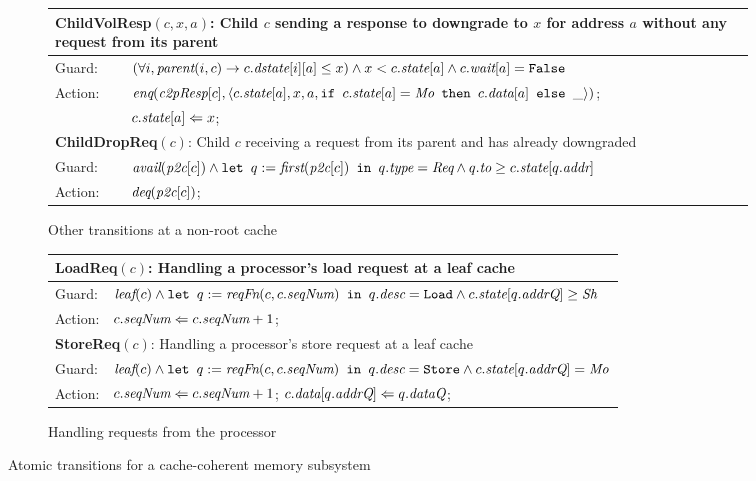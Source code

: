 \begin{figure}
\begin{subfigure}{\textwidth}
\centering
\begin{tabular}{|ll|}
\hline
\multicolumn{2}{|p{\textwidth}|}{\textbf{ChildVolResp}$(c, x, a)$: Child $c$
sending a response to downgrade to $x$ for address $a$ without any request from
its parent}\\
\hline
Guard: & $(\forall i, \textit{parent}(i, c) \rightarrow c.\textit{dstate}[i][a] \le x) \wedge x < c.\textit{state}[a] \wedge c.\textit{wait}[a] = \texttt{False}$\\
\hline
Action: & $\enq(\cpResp[c], \langle c.\state[a], x, a,%
\myif c.\state[a] = \Mo \mythen c.\data[a] \myelse \_\rangle)$;\\
& $c.\textit{state}[a] \Leftarrow x$;\\
\hline
\hline
\multicolumn{2}{|p{\textwidth}|}{\textbf{ChildDropReq}$(c)$: Child $c$
receiving a request from its parent and has already downgraded}\\
\hline
Guard: & 
$\textit{avail}(\textit{p2c}[c]) \wedge \texttt{let } q := \textit{first}(\textit{p2c}[c]) \texttt{ in } q.\textit{type} = \textit{Req} \wedge q.\textit{to} \ge c.\textit{state}[q.\textit{addr}]$\\
\hline
Action: & $\textit{deq}(\textit{p2c}[c])$;\\
\hline
\end{tabular}
\caption{Other transitions at a non-root cache}
\label{childextra}
\end{subfigure}

\begin{subfigure}{\textwidth}
\centering
\begin{tabular}{|ll|}
\hline
\multicolumn{2}{|l|}{\textbf{LoadReq}$(c)$: Handling a processor's load request at a leaf cache}\\
\hline
Guard: & $\textit{leaf}(c) \wedge \texttt{let } q := \textit{reqFn}(c, c.\textit{seqNum}) \texttt{ in } q.\textit{desc} = \texttt{Load} \wedge c.\textit{state}[q.\textit{addrQ}] \ge \textit{Sh}$\\
\hline
Action:& $c.\textit{seqNum} \Leftarrow c.\textit{seqNum} + 1$;\\
\hline
\hline
\multicolumn{2}{|l|}{\textbf{StoreReq}$(c)$: Handling a processor's store request at a leaf cache}\\
\hline
Guard: & $\textit{leaf}(c) \wedge \texttt{let } q := \textit{reqFn}(c, c.\textit{seqNum}) \texttt{ in } q.\textit{desc} = \texttt{Store} \wedge c.\textit{state}[q.\textit{addrQ}] = \textit{Mo}$\\
\hline
\hline
Action:& $c.\textit{seqNum} \Leftarrow c.\textit{seqNum} + 1$; $c.\textit{data}[q.\textit{addrQ}] \Leftarrow q.\textit{dataQ}$;\\
\hline
\end{tabular}
\caption{Handling requests from the processor}
\label{procside}
\end{subfigure}
\caption{Atomic transitions for a cache-coherent memory subsystem}
\label{trans}
\end{figure}

